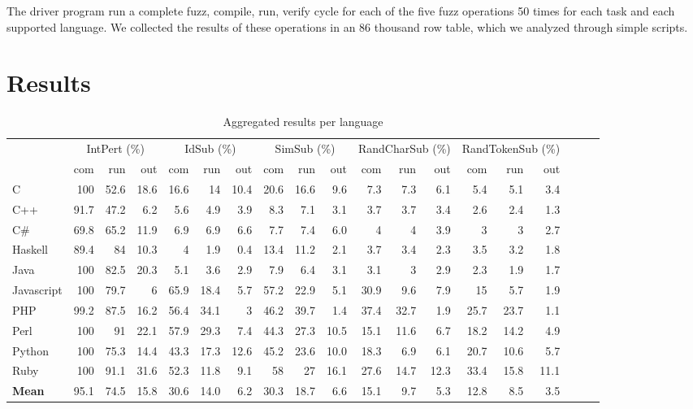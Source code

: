 \documentclass[10pt]{sigplanconf}
\begin{document}
The driver program run a complete fuzz, compile, run, verify cycle
for each of the five fuzz operations 50 times for
each task and each supported language.
We collected the results of these operations in an 86 thousand row
table,
which we analyzed through simple scripts.

\section{Results} %
\label{sec:results}

\begin{table*}
\begin{center}
\begin{tabular}{ l r r r r r r r r r r r r r r r r r r }
& \multicolumn{3}{c}{IntPert (\%)} & \multicolumn{3}{c}{IdSub (\%)} & \multicolumn{3}{c}{SimSub (\%)} & \multicolumn{3}{c}{RandCharSub (\%)} & \multicolumn{3}{c}{RandTokenSub (\%)}\\ 
	       & com  & run  & out  & com  & run  & out  & com  & run  & out  & com & run   & out  & com  & run  & out\\
\hline															
C          & 100  & 52.6 & 18.6 & 16.6 & 14   & 10.4 & 20.6	& 16.6 & 9.6  &	7.3	 & 7.3  & 6.1  & 5.4  & 5.1  & 3.4\\
C++        & 91.7 &	47.2 & 6.2  & 5.6  & 4.9  & 3.9	 & 8.3	& 7.1  & 3.1  & 3.7	 & 3.7  & 3.4  & 2.6  & 2.4  & 1.3\\
C\#        & 69.8 & 65.2 & 11.9 & 6.9  & 6.9  & 6.6	 & 7.7	& 7.4  & 6.0  & 4	 & 4    & 3.9  & 3    & 3    & 2.7\\
Haskell    & 89.4 & 84   & 10.3 & 4    & 1.9  & 0.4	 & 13.4	& 11.2 & 2.1  & 3.7	 & 3.4  & 2.3  & 3.5  & 3.2  & 1.8\\
Java       & 100  & 82.5 & 20.3 & 5.1  & 3.6  & 2.9	 & 7.9	& 6.4  & 3.1  & 3.1	 & 3    & 2.9  & 2.3  & 1.9  & 1.7\\
Javascript & 100  & 79.7 & 6    & 65.9 & 18.4 & 5.7	 & 57.2	& 22.9 & 5.1  & 30.9 & 9.6  & 7.9  & 15   & 5.7  & 1.9\\
PHP        & 99.2 & 87.5 & 16.2 & 56.4 & 34.1 & 3	 & 46.2	& 39.7 & 1.4  & 37.4 & 32.7 & 1.9  & 25.7 & 23.7 & 1.1\\
Perl       & 100  & 91   & 22.1 & 57.9 & 29.3 & 7.4	 & 44.3	& 27.3 & 10.5 & 15.1 & 11.6	& 6.7  & 18.2 & 14.2 & 4.9\\
Python     & 100  & 75.3 & 14.4 & 43.3 & 17.3 & 12.6 & 45.2	& 23.6 & 10.0 & 18.3 & 6.9	& 6.1  & 20.7 & 10.6 & 5.7\\
Ruby       & 100  & 91.1 & 31.6 & 52.3 & 11.8 & 9.1	 & 58	& 27   & 16.1 & 27.6 & 14.7	& 12.3 & 33.4 & 15.8 & 11.1\\
\hline															
\textbf{Mean} & 95.1 & 74.5 & 15.8 & 30.6 & 14.0 & 6.2  & 30.3 & 18.7 & 6.6  & 15.1 & 9.7  & 5.3  & 12.8 & 8.5  & 3.5\\
\end{tabular}
\end{center}
\caption{Aggregated results per language}
\label{tbl:aggregated-per-language}
\end{table*}
\end{document}
